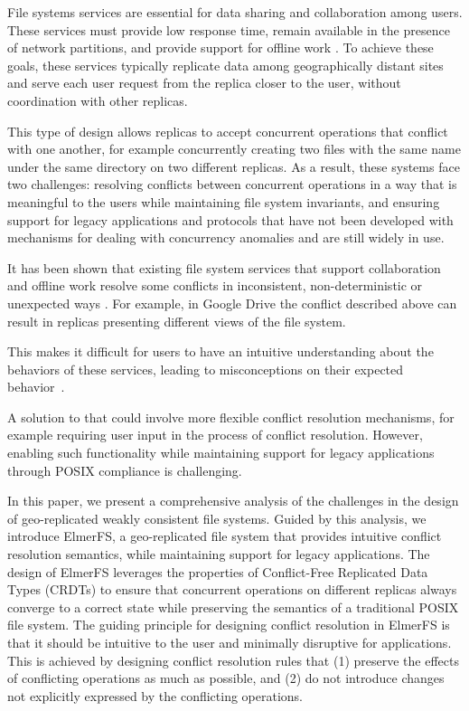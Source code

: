 \documentclass[sigconf, 10pt]{acmart}
\begin{document}
File systems services are essential for data sharing and collaboration among users.
These services must provide low response time, remain available in the presence
of network partitions, and provide support for offline work \cite{howard1988scale}.
To achieve these goals, these services typically replicate
data among geographically distant sites and serve each user request from the replica
closer to the user, without coordination with other replicas.

This type of design allows replicas to accept concurrent operations that conflict
with one another, for example concurrently creating two files with the same name
under the same directory on two different replicas.
As a result, these systems face two challenges:
resolving conflicts between concurrent operations in a way that is meaningful to the users while maintaining file system invariants,
and ensuring support for legacy applications and protocols that have not been developed with mechanisms for dealing with concurrency anomalies and are still widely in use.

It has been shown that existing file system services that support collaboration
and offline work resolve some conflicts in inconsistent, non-deterministic or unexpected ways \cite{cai2018some, taothanh:tel-01673030}.
For example, in Google Drive the conflict described above can result in replicas presenting different views of the file system.

This makes it difficult for users to have an intuitive understanding about
the behaviors of these services,
leading to misconceptions on their expected behavior~\cite{tang2013you}.

A solution to that could involve more flexible conflict resolution mechanisms,
for example requiring user input in the process of conflict resolution.
However, enabling such functionality while maintaining support for legacy applications
through POSIX compliance is challenging.

In this paper, we present a comprehensive analysis of the challenges in
the design of geo-replicated weakly consistent file systems.
Guided by this analysis, we introduce ElmerFS,
a geo-replicated file system that provides intuitive conflict resolution
semantics, while maintaining support for legacy applications.
The design of ElmerFS leverages the properties of Conflict-Free Replicated Data Types (CRDTs) to ensure that concurrent operations on different replicas always converge to a correct state while preserving the semantics of a traditional POSIX file system.
The guiding principle for designing conflict resolution in ElmerFS is that
it should be intuitive to the user and minimally disruptive for applications.
This is achieved by designing conflict resolution rules that
(1) preserve the effects of conflicting operations as much as possible,
and (2) do not introduce changes not explicitly expressed by the conflicting operations.
\end{document}
